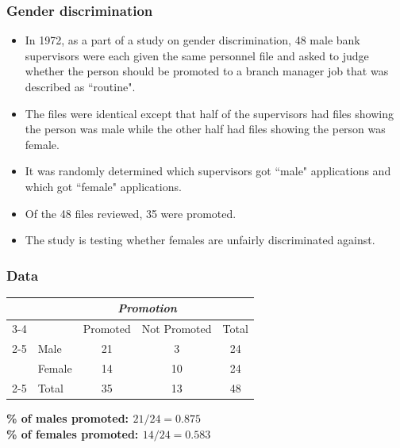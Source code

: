 \documentclass[slidestop,compress,mathserif]{beamer}
\newcommand{\soln}[1]{\textit{#1}}
\begin{document}

\begin{frame}
\frametitle{Gender discrimination}

\begin{itemize}

\item In 1972, as a part of a study on gender discrimination, 48 male bank supervisors were each given the same personnel file and asked to judge whether the person should be promoted to a branch manager job that was described as ``routine". 

\item The files were identical except that half of the supervisors had files showing the person was male while the other half had files showing the person was female.

\item It was randomly determined which supervisors got ``male" applications and which got ``female" applications.  

\item Of the 48 files reviewed, 35 were promoted. 

\item The study is testing whether females are unfairly discriminated against.  
\end{itemize}

 \soln{}


\end{frame}



\begin{frame}
\frametitle{Data}


\begin{center}
\begin{tabular}{ll  cc c} 
  		&				& \multicolumn{2}{c}{\textit{Promotion}} \\
\cline{3-4}
							&			& Promoted	& Not Promoted 	& Total	\\
\cline{2-5}
\multirow{2}{*}{\textit{Gender	}}	&Male 		& 21	 	& 3		& 24 	\\
							&Female		& 14	 	& 10 	 	& 24 \\
\cline{2-5}
							&Total		& 35		& 13		& 48 \\
\end{tabular}
\end{center}

\pause

\textbf{\% of males promoted: $21 / 24 = 0.875$} \\
\textbf{\% of females promoted: $14 / 24 = 0.583$}

\end{frame}
\end{document}
